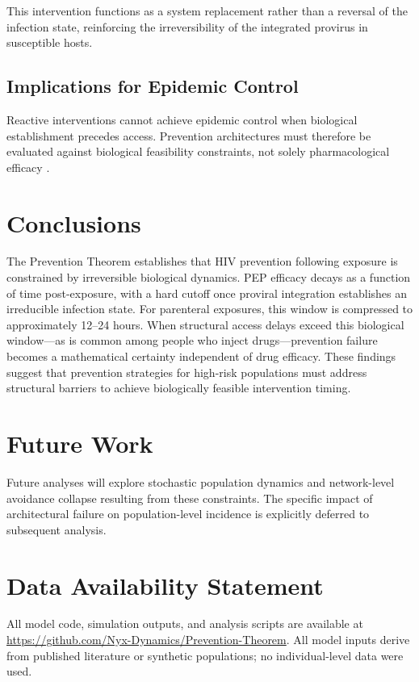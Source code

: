 \documentclass[12pt]{article}
\begin{document}
This intervention functions as a system replacement rather than a reversal of the infection state, reinforcing the irreversibility of the integrated provirus in susceptible hosts.

\subsection{Implications for Epidemic Control}

Reactive interventions cannot achieve epidemic control when biological establishment precedes access. Prevention architectures must therefore be evaluated against biological feasibility constraints, not solely pharmacological efficacy \cite{palella_declining_1998}.

\section{Conclusions}

The Prevention Theorem establishes that HIV prevention following exposure is constrained by irreversible biological dynamics. PEP efficacy decays as a function of time post-exposure, with a hard cutoff once proviral integration establishes an irreducible infection state. For parenteral exposures, this window is compressed to approximately 12--24 hours. When structural access delays exceed this biological window---as is common among people who inject drugs---prevention failure becomes a mathematical certainty independent of drug efficacy. These findings suggest that prevention strategies for high-risk populations must address structural barriers to achieve biologically feasible intervention timing.

\section{Future Work}

Future analyses will explore stochastic population dynamics and network-level avoidance collapse resulting from these constraints. The specific impact of architectural failure on population-level incidence is explicitly deferred to subsequent analysis.

\section*{Data Availability Statement}

All model code, simulation outputs, and analysis scripts are available at \url{https://github.com/Nyx-Dynamics/Prevention-Theorem}. All model inputs derive from published literature or synthetic populations; no individual-level data were used.
\end{document}
